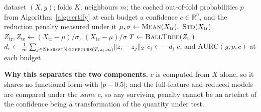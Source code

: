 \documentclass[fleqn,10pt]{wlscirep}
\begin{document}
\begin{algorithm}[t]
\caption{\textsc{SupportDistanceConfidence}: a confidence signal the predicted probability never
enters, used to separate the part of the selective-reliability penalty that is a property of the
probability scale from the part that is not.}
\label{alg:distconf}
\begin{algorithmic}[1]
\Require dataset $(X,y)$; folds $K$; neighbours $m$; the cached out-of-fold probabilities $p$ from
  Algorithm~\ref{alg:certify} at each budget
\Ensure a confidence $c\in\mathbb{R}^{n}$, and the reduction penalty measured under it
  \State $\mu,\sigma \gets \textsc{Mean}(X_{\mathrm{tr}}),\ \textsc{Std}(X_{\mathrm{tr}})$ 
  \State $Z_{\mathrm{tr}},Z_{\mathrm{te}} \gets (X_{\mathrm{tr}}-\mu)/\sigma,\ (X_{\mathrm{te}}-\mu)/\sigma$
  \State $T \gets \textsc{BallTree}(Z_{\mathrm{tr}})$ 
    \State $d_i \gets \tfrac{1}{m}\sum_{j\in\textsc{NearestNeighbours}(T, z_i, m)} \lVert z_i - z_j\rVert_2$
    \State $c_i \gets -d_i$ 
  \EndFor
\EndFor
\State \Return $c$, and $\mathrm{AURC}(y,p,c)$ at each budget
\end{algorithmic}
\textbf{Why this separates the two components.} $c$ is computed from $X$ alone, so it shares no
functional form with $|p-0.5|$; and the full-feature and reduced models are compared under the
\emph{same} $c$, so any surviving penalty cannot be an artefact of the confidence being a
transformation of the quantity under test.
\end{algorithm}
\end{document}
